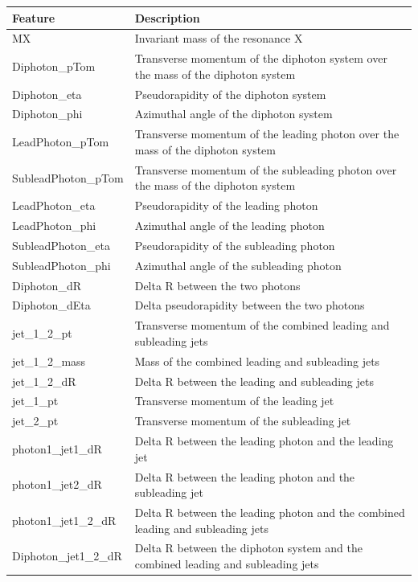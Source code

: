 \begin{table}[htbp!]
    \centering
    \begin{tabularx}{\textwidth}{|l|X|}
    \hline
    \textbf{Feature} & \textbf{Description} \\
    \hline
    MX & Invariant mass of the resonance X \\
    Diphoton\_pTom & Transverse momentum of the diphoton system over the mass of the diphoton system \\
    Diphoton\_eta & Pseudorapidity of the diphoton system \\
    Diphoton\_phi & Azimuthal angle of the diphoton system \\
    LeadPhoton\_pTom & Transverse momentum of the leading photon over the mass of the diphoton system \\
    SubleadPhoton\_pTom & Transverse momentum of the subleading photon over the mass of the diphoton system \\
    LeadPhoton\_eta & Pseudorapidity of the leading photon \\
    LeadPhoton\_phi & Azimuthal angle of the leading photon \\
    SubleadPhoton\_eta & Pseudorapidity of the subleading photon \\
    SubleadPhoton\_phi & Azimuthal angle of the subleading photon \\
    Diphoton\_dR & Delta R between the two photons \\
    Diphoton\_dEta & Delta pseudorapidity between the two photons \\
    jet\_1\_2\_pt & Transverse momentum of the combined leading and subleading jets \\
    jet\_1\_2\_mass & Mass of the combined leading and subleading jets \\
    jet\_1\_2\_dR & Delta R between the leading and subleading jets \\
    jet\_1\_pt & Transverse momentum of the leading jet \\
    jet\_2\_pt & Transverse momentum of the subleading jet \\
    photon1\_jet1\_dR & Delta R between the leading photon and the leading jet \\
    photon1\_jet2\_dR & Delta R between the leading photon and the subleading jet \\
    photon1\_jet1\_2\_dR & Delta R between the leading photon and the combined leading and subleading jets \\
    Diphoton\_jet1\_2\_dR & Delta R between the diphoton system and the combined leading and subleading jets \\

\end{tabularx}
\end{table}
